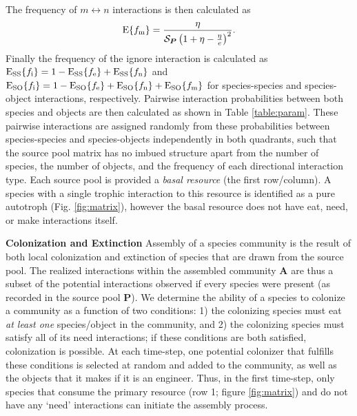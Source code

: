 \documentclass[twocolumn,preprintnumbers,amsmath,amssymb,superscriptaddress]{revtex4}
\newcommand{\rr}[1]{{\rm #1}}
\begin{document}
The frequency of $m \leftrightarrow n$ interactions is then calculated as
\begin{equation}
{\rm E}\{f_\rr{m}\} = \frac{\eta}{\mathcal{S}_{\bm P}\left(1 + \eta - \frac{\eta}{e}\right)^2}.
\end{equation}
Finally the frequency of the ignore interaction is calculated as $\rr{E_{SS}}\{f_\rr{i}\} = 1 - \rr{E_{SS}}\{f_\rr{e}\} + \rr{E_{SS}}\{f_\rr{n}\}$ and  $\rr{E_{SO}}\{f_\rr{i}\} = 1 - \rr{E_{SO}}\{f_\rr{e}\} + \rr{E_{SO}}\{f_\rr{n}\}+ \rr{E_{SO}}\{f_\rr{m}\}$ for species-species and species-object interactions, respectively.
Pairwise interaction probabilities between both species and objects are then calculated as shown in Table \ref{table:param}.
These pairwise interactions are assigned randomly from these probabilities between species-species and species-objects independently in both quadrants, such that the source pool matrix has no imbued structure apart from the number of species, the number of objects, and the frequency of each directional interaction type.
Each source pool is provided a \emph{basal resource} (the first row/column).
A species with a single trophic interaction to this resource is identified as a pure autotroph (Fig. \ref{fig:matrix}), however the basal resource does not have eat, need, or make interactions itself.


\textbf{Colonization and Extinction} Assembly of a species community is the result of both local colonization and extinction of species that are drawn from the source pool.
The realized interactions within the assembled community $\bm A$ are thus a subset of the potential interactions observed if every species were present (as recorded in the source pool $\bm P$). 
We determine the ability of a species to colonize a community as a function of two conditions:
1) the colonizing species must eat \emph{at least one} species/object in the community, and
2) the colonizing species must satisfy all of its need interactions; if these conditions are both satisfied, colonization is possible.
At each time-step, one potential colonizer that fulfills these conditions is selected at random and added to the community, as well as the objects that it makes if it is an engineer.
Thus, in the first time-step, only species that consume the primary resource (row 1; figure \ref{fig:matrix}) and do not have any `need' interactions can initiate the assembly process.
\end{document}
